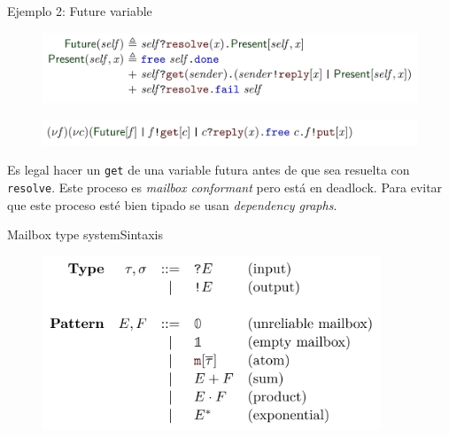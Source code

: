 \documentclass{beamer}
\newcommand{\msgtag}[1]{\texttt{\textcolor{msg-color}{#1}}}
\begin{document}
\begin{frame}{Ejemplo 2: Future variable}
    \begin{figure}[H]
        \includegraphics[width=\textwidth]{example2-future}
    \end{figure}
    \begin{figure}[H]
        \includegraphics[width=\textwidth]{example2-deadlock}
    \end{figure}

    Es legal hacer un \msgtag{get} de una variable futura antes de que sea resuelta con \msgtag{resolve}. Este proceso es \emph{mailbox conformant} pero está en deadlock. Para evitar que este proceso esté bien tipado se usan \emph{dependency graphs}.
\end{frame}

\begin{frame}{Mailbox type system}{Sintaxis}
    \begin{figure}[H]
        \includegraphics[width=0.9\textwidth]{type-syntax}
    \end{figure}
\end{frame}
\end{document}
